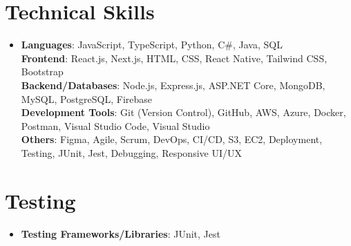 \documentclass[letterpaper,11pt]{article}
\begin{document}
\section{Technical Skills} %
\begin{itemize}[leftmargin=0.15in, label={}]
\item{
\textbf{Languages}{: JavaScript, TypeScript, Python, C\#, Java, SQL} \\
\textbf{Frontend}{: React.js, Next.js, HTML, CSS, React Native, Tailwind CSS, Bootstrap} \\
\textbf{Backend/Databases}{: Node.js, Express.js, ASP.NET Core, MongoDB, MySQL, PostgreSQL, Firebase} \\
\textbf{Development Tools}{: Git (Version Control), GitHub, AWS, Azure, Docker, Postman, Visual Studio Code, Visual Studio} \\
\textbf{Others}{: Figma, Agile, Scrum, DevOps, CI/CD, S3, EC2, Deployment, Testing, JUnit, Jest, Debugging, Responsive UI/UX}
} \\
\end{itemize}

\section{Testing}
\begin{itemize}[leftmargin=0.15in, label={}]
\item{
\textbf{Testing Frameworks/Libraries}{: JUnit, Jest}
} \\
\end{itemize}


\end{document}
